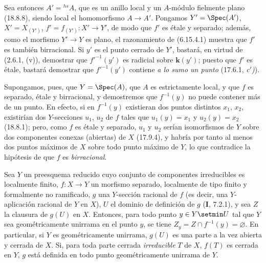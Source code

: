 Sea entonces $A'={}^{hs}\!A$, que es un anillo local y un $A$-módulo 
fielmente plano (18.8.8), siendo local el homomorfismo $A\to A'$. Pongamos $Y'=\Spec(A')$, $X'=X_{(Y')}$, $f'=f_{(Y')}:X'\to Y'$, de modo que $f'$ es étale y separado; además, como el morfismo $Y'\to Y$ es plano, el razonamiento de (6.15.4.1) muestra que $f'$ es también birracional. Si $y'$ es el punto cerrado de $Y'$, bastará, en virtud de (2.6.1, (v)), demostrar que $f'^{-1}(y')$ es radicial sobre $\boldsymbol{k}(y')$; puesto que $f'$ es étale, bastará demostrar que $f'^{-1}(y')$ contiene \emph{a lo sumo un punto} (17.6.1, \emph{c$'$)}).

Supongamos, pues, que $Y=\Spec(A)$, que $A$ es estrictamente local, y que $f$ es separado, étale y birracional, y demostremos que $f^{-1}(y)$ no puede contener más de un punto. En efecto, si en $f^{-1}(y)$ existieran dos puntos distintos $x_1$, $x_2$, existirían dos $Y$-secciones $u_1$, $u_2$ de $f$ tales que $u_1(y)=x_1$ y $u_2(y)=x_2$ (18.8.1); pero, como $f$ es étale y separado, $u_1$ y $u_2$ serían isomorfismos de $Y$ sobre dos componentes conexas (abiertas) de $X$ (17.9.4), y habría por tanto al menos dos puntos máximos de $X$ sobre todo punto máximo de $Y$, lo que contradice la hipótesis de que $f$ es \emph{birracional}.

\begin{proposition}[18.10.19]
\label{IV.18.10.19}
Sea $Y$ un preesquema reducido cuyo conjunto de componentes irreducibles es localmente finito, $f:X\to Y$ un morfismo separado, localmente de tipo finito y formalmente no ramificado, $g$ una $Y$-sección racional de $f$ \textup{(es decir,} una $Y$-aplicación racional de $Y$ en $X$\textup{)}, $U$ el dominio de definición de $g$ \textup{(\textbf I, 7.2.1)}, y sea $Z$ la clausura de $g(U)$ en $X$. Entonces, para todo punto $y\in Y\setmin U$ tal que $Y$ sea geométricamente unirrama en el punto $y$, se tiene $Z_y=Z\cap f^{-1}(y)=\varnothing$. En particular, si $Y$ es geométricamente unirrama, $g(U)$ es una parte a la vez abierta y cerrada de $X$. Si, para toda parte cerrada \emph{irreducible} $T$ de $X$, $f(T)$ es cerrada en $Y$, $g$ está definida en todo punto geométricamente unirrama de $Y$.
\end{proposition}

